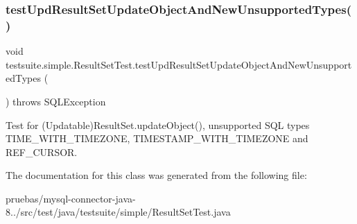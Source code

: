 \subsubsection{\texorpdfstring{test\+Upd\+Result\+Set\+Update\+Object\+And\+New\+Unsupported\+Types()}{testUpdResultSetUpdateObjectAndNewUnsupportedTypes()}}
{\footnotesize\ttfamily void testsuite.\+simple.\+Result\+Set\+Test.\+test\+Upd\+Result\+Set\+Update\+Object\+And\+New\+Unsupported\+Types (\begin{DoxyParamCaption}{ }\end{DoxyParamCaption}) throws S\+Q\+L\+Exception}

Test for (Updatable)Result\+Set.\+update\+Object(), unsupported S\+QL types T\+I\+M\+E\+\_\+\+W\+I\+T\+H\+\_\+\+T\+I\+M\+E\+Z\+O\+NE, T\+I\+M\+E\+S\+T\+A\+M\+P\+\_\+\+W\+I\+T\+H\+\_\+\+T\+I\+M\+E\+Z\+O\+NE and R\+E\+F\+\_\+\+C\+U\+R\+S\+OR. 

The documentation for this class was generated from the following file\+:\begin{DoxyCompactItemize}
\item 
pruebas/mysql-\/connector-\/java-\/8../src/test/java/testsuite/simple/Result\+Set\+Test.\+java\end{DoxyCompactItemize}
